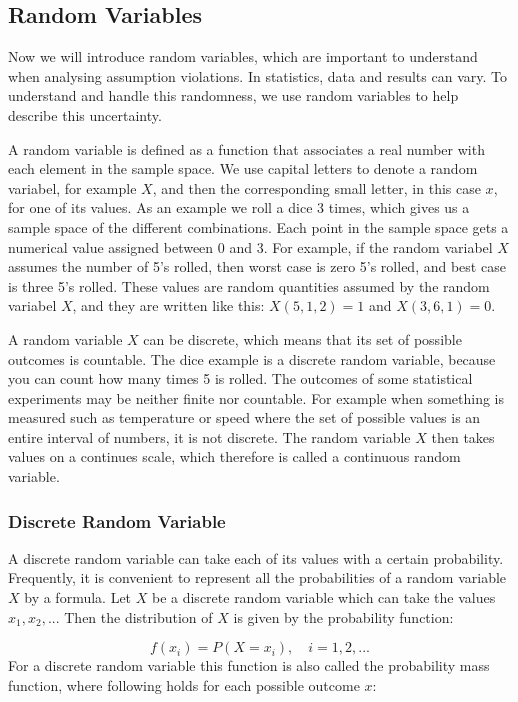 
\subsection{Random Variables}
Now we will introduce random variables, which are important to understand when analysing assumption violations. In statistics, data and results can vary. To understand and handle this randomness, we use random variables to help describe this uncertainty. \newline

\noindent A random variable is defined as a function that associates a real number with each element in the sample space. We use capital letters to denote a random variabel, for example $X$, and then the corresponding small letter, in this case $x$, for one of its values. As an example we roll a dice 3 times, which gives us a sample space of the different combinations. Each point in the sample space gets a numerical value assigned between 0 and 3. For example, if the random variabel $X$ assumes the number of 5's rolled, then worst case is zero 5's rolled, and best case is three 5's rolled. These values are random quantities assumed by the random variabel $X$, and they are written like this: $X(5,1,2) = 1$ and $X(3,6,1) = 0$.
\newline

\noindent A random variable $X$ can be discrete, which means that its set of possible outcomes is countable. The dice example is a discrete random variable, because you can count how many times 5 is rolled. The outcomes of some statistical experiments may be neither finite nor countable. For example when something is measured such as temperature or speed where the set of possible values is an entire interval of numbers, it is not discrete. The random variable $X$ then takes values on a continues scale, which therefore is called a continuous random variable.

\subsubsection{Discrete Random Variable}
\label{sec:disc}
A discrete random variable can take each of its values with a certain probability. Frequently, it is convenient to represent all the probabilities of a random variable $X$ by a formula. Let $X$ be a discrete random variable which can take the values $x_{1}, x_{2},...$ Then the distribution of $X$ is given by the probability function:

\begin{equation}
	f(x_{i})=P(X=x_{i}),\quad i=1,2,...
\end{equation}
\newline
For a discrete random variable this function is also called the probability mass function, where following holds for each possible outcome $x$:

